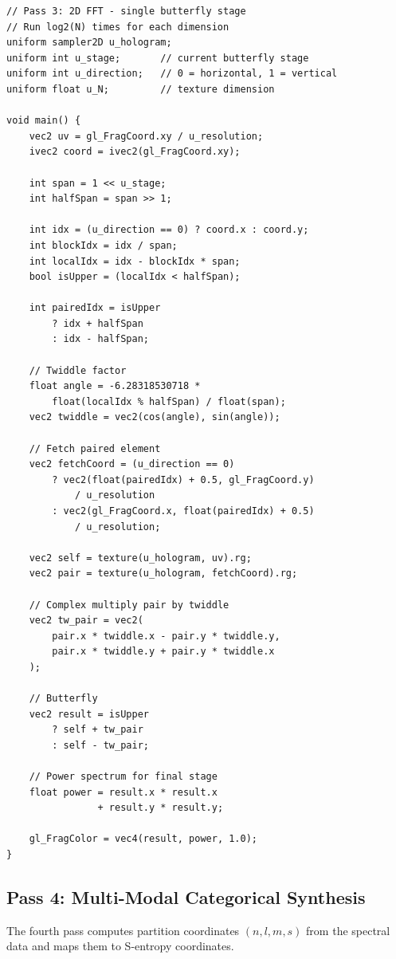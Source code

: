 \documentclass[11pt,twocolumn,a4paper]{article}
\theoremstyle{definition}
\theoremstyle{remark}
\begin{document}
\begin{lstlisting}[style=glsl, caption={Pass 3: 2D FFT butterfly pass}, label={lst:pass3}]
// Pass 3: 2D FFT - single butterfly stage
// Run log2(N) times for each dimension
uniform sampler2D u_hologram;
uniform int u_stage;       // current butterfly stage
uniform int u_direction;   // 0 = horizontal, 1 = vertical
uniform float u_N;         // texture dimension

void main() {
    vec2 uv = gl_FragCoord.xy / u_resolution;
    ivec2 coord = ivec2(gl_FragCoord.xy);

    int span = 1 << u_stage;
    int halfSpan = span >> 1;

    int idx = (u_direction == 0) ? coord.x : coord.y;
    int blockIdx = idx / span;
    int localIdx = idx - blockIdx * span;
    bool isUpper = (localIdx < halfSpan);

    int pairedIdx = isUpper
        ? idx + halfSpan
        : idx - halfSpan;

    // Twiddle factor
    float angle = -6.28318530718 *
        float(localIdx % halfSpan) / float(span);
    vec2 twiddle = vec2(cos(angle), sin(angle));

    // Fetch paired element
    vec2 fetchCoord = (u_direction == 0)
        ? vec2(float(pairedIdx) + 0.5, gl_FragCoord.y)
            / u_resolution
        : vec2(gl_FragCoord.x, float(pairedIdx) + 0.5)
            / u_resolution;

    vec2 self = texture(u_hologram, uv).rg;
    vec2 pair = texture(u_hologram, fetchCoord).rg;

    // Complex multiply pair by twiddle
    vec2 tw_pair = vec2(
        pair.x * twiddle.x - pair.y * twiddle.y,
        pair.x * twiddle.y + pair.y * twiddle.x
    );

    // Butterfly
    vec2 result = isUpper
        ? self + tw_pair
        : self - tw_pair;

    // Power spectrum for final stage
    float power = result.x * result.x
                + result.y * result.y;

    gl_FragColor = vec4(result, power, 1.0);
}
\end{lstlisting}

\subsection{Pass 4: Multi-Modal Categorical Synthesis}

The fourth pass computes partition coordinates $(n, l, m, s)$ from the spectral data and maps them to S-entropy coordinates.
\end{document}
